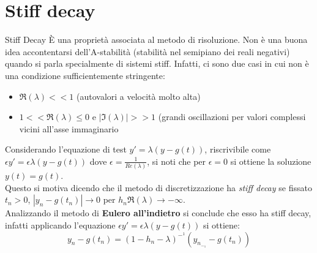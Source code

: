 \documentclass[aspectratio=169, 10pt, handout,usenames,dvipsnames]{beamer}
\begin{document}
\section{Stiff decay}\label{sec:sec11}    
    \begin{frame}{Stiff Decay}
        È una proprietà associata al metodo di risoluzione.
        Non è una buona idea accontentarsi dell’A-stabilità (stabilità nel semipiano dei reali negativi) quando si parla specialmente di sistemi stiff. 
        Infatti, ci sono due casi in cui non è una condizione sufficientemente stringente:
        \begin{itemize}
            \item $\Re(\lambda)<<1$ (autovalori a velocità molto alta)
            \item $1<<\Re(\lambda)\leq0$ e $|\Im(\lambda)|>>1$ (grandi oscillazioni per valori complessi vicini all’asse immaginario
        \end{itemize}
        Considerando l’equazione di test $y'= \lambda(y-g(t))$, riscrivibile come $\epsilon y'= \epsilon\lambda(y-g(t))$ dove $\epsilon=\frac{1}{Re(\lambda)}$, si noti che per $\epsilon=0$ si ottiene la soluzione $y(t) = g(t)$. \\
        Questo si motiva dicendo che il metodo di discretizzazione ha \textit{stiff decay} se fissato $t_n>0$, $|y_n-g(t_n)|\rightarrow 0$ per $h_n\Re(\lambda)\rightarrow -\infty$.\\
        Analizzando il metodo di \textbf{Eulero all’indietro} si conclude che esso ha stiff decay, infatti applicando l’equazione $\epsilon y'= \epsilon\lambda(y-g(t))$ si ottiene: $$y_n-g(t_n)=(1-h_n-\lambda)^-^1(y_n_-_1-g(t_n))$$
        
    \end{frame}
    
\end{document}
